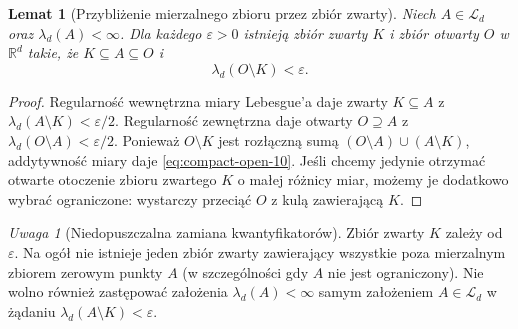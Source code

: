 \documentclass[11pt,a4paper,oneside]{book}
\numberwithin{equation}{chapter}
\theoremstyle{plain}
\newtheorem{lemat}[twierdzenie]{Lemat}
\theoremstyle{definition}
\theoremstyle{remark}
\newtheorem{uwaga}[twierdzenie]{Uwaga}
\begin{document}
\begin{lemat}[Przybliżenie mierzalnego zbioru przez zbiór zwarty]
\label{lem:compact-inside-10}
Niech $A\in\mathcal L_d$ oraz $\lambda_d(A)<\infty$.
Dla każdego $\varepsilon>0$ istnieją zbiór
zwarty $K$ i zbiór otwarty $O$ w $\mathbb R^d$ takie,
że $K\subseteq A\subseteq O$ i
\begin{equation}\label{eq:compact-open-10}
\lambda_d(O\setminus K)<\varepsilon.
\end{equation}
\end{lemat}
\begin{proof}
Regularność wewnętrzna miary Lebesgue'a daje
zwarty $K\subseteq A$ z
$\lambda_d(A\setminus K)<\varepsilon/2$.
Regularność zewnętrzna daje otwarty $O\supseteq A$
z $\lambda_d(O\setminus A)<\varepsilon/2$.
Ponieważ $O\setminus K$ jest rozłączną sumą
$(O\setminus A)\cup(A\setminus K)$,
addytywność miary daje \eqref{eq:compact-open-10}.
Jeśli chcemy jedynie otrzymać otwarte otoczenie
zbioru zwartego $K$ o małej różnicy miar,
możemy je dodatkowo wybrać ograniczone:
wystarczy przeciąć $O$ z kulą zawierającą $K$.
\end{proof}

\begin{uwaga}[Niedopuszczalna zamiana kwantyfikatorów]
Zbiór zwarty $K$ zależy od $\varepsilon$.
Na ogół nie istnieje jeden zbiór zwarty zawierający
wszystkie poza mierzalnym zbiorem zerowym punkty
$A$ (w szczególności gdy $A$ nie jest ograniczony).
Nie wolno również zastępować założenia
$\lambda_d(A)<\infty$ samym założeniem
$A\in\mathcal L_d$ w żądaniu
$\lambda_d(A\setminus K)<\varepsilon$.
\end{uwaga}
\end{document}
